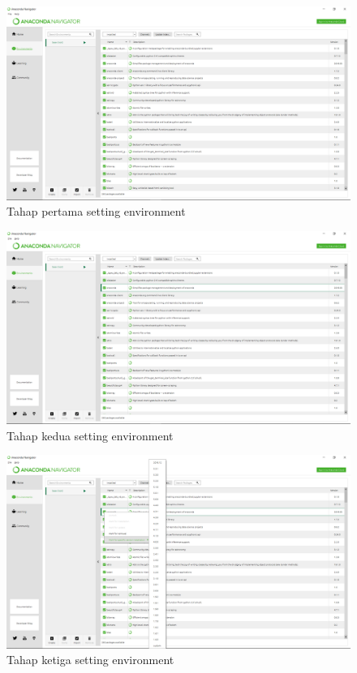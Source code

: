 \begin{enumerate}
\begin{itemize}
    \begin{figure} [!htbp]
    \centering
    \includegraphics[scale=0.2]{figures/A3.png}
    \caption{Tahap pertama setting environment}
\end{figure}

    \begin{figure} [!htbp]
    \centering
    \includegraphics[scale=0.2]{figures/A4.png}
    \caption{Tahap kedua setting environment}
\end{figure}

    \begin{figure} [!htbp]
    \centering
    \includegraphics[scale=0.2]{figures/A5.png}
    \caption{Tahap ketiga setting environment}
\end{figure}


\end{itemize}
\end{enumerate}
